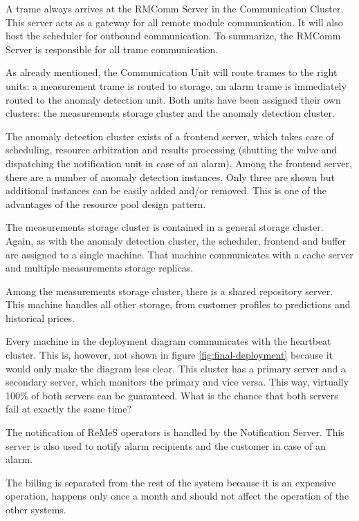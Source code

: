 \npar A trame always arrives at the RMComm Server in the Communication Cluster.
This server acts as a gateway for all remote module communication. It will also
host the scheduler for outbound communication. To summarize, the RMComm Server
is responsible for all trame communication. 

\npar As already mentioned, the Communication Unit will route trames to the
right units: a measurement trame is routed to storage, an alarm trame is
immediately routed to the anomaly detection unit. Both units have been assigned
their own clusters: the measurements storage cluster and the anomaly detection
cluster. 

\npar The anomaly detection cluster exists of a frontend server, which takes
care of scheduling, resource arbitration and results processing
(shutting the valve and dispatching the notification unit in case of an alarm).
Among the frontend server, there are a number of anomaly detection instances.
Only three are shown but additional instances can be easily added and/or
removed. This is one of the advantages of the resource pool design pattern.

\npar The measurements storage cluster is contained in a general storage
cluster. Again, as with the anomaly detection cluster, the scheduler, frontend
and buffer are assigned to a single machine. That machine communicates with a
cache server and multiple measurements storage replicas. 

\npar Among the measurements storage cluster, there is a shared repository
server. This machine handles all other storage, from customer profiles to
predictions and historical prices. 

\npar Every machine in the deployment diagram communicates with the heartbeat
cluster. This is, however, not shown in figure \ref{fig:final-deployment}
because it would only make the diagram less clear. This cluster has a primary
server and a secondary server, which monitors the primary and vice versa. This
way, virtually 100\% of both servers can be guaranteed. What is the chance that
both servers fail at exactly the same time?

\npar The notification of ReMeS operators is handled by the Notification Server.
This server is also used to notify alarm recipients and the customer in case of
an alarm. 

\npar The billing is separated from the rest of the system because it is an
expensive operation, happens only once a month and should not affect the
operation of the other systems. 

